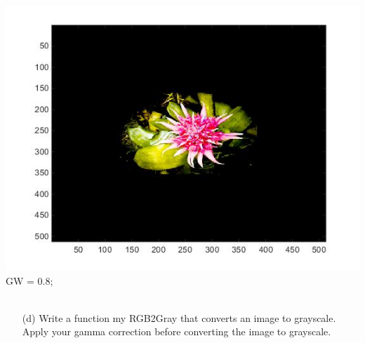        \includegraphics[scale=0.45]{images/SolutionFourth2Part.jpg}
        \\ GW = 0.8; \\
         \\ 
\pagebreak
    \begin{enumerate}        
        \item[(d)] {Write a function my RGB2Gray that converts an image to grayscale. Apply your gamma correction before converting the image to grayscale.}
    \end{enumerate}        
